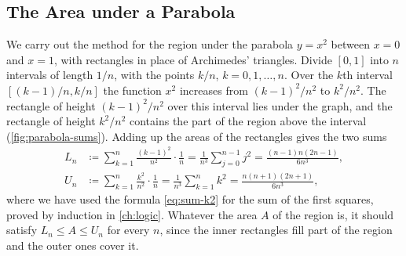\subsection{The Area under a Parabola}

We carry out the method for the region under the parabola $y=x^2$ between $x=0$ and $x=1$, with rectangles in place of Archimedes' triangles. Divide $[0,1]$ into $n$ intervals of length $1/n$, with the points $k/n$, $k=0,1,\ldots,n$. Over the $k$th interval $[(k-1)/n,k/n]$ the function $x^2$ increases from $(k-1)^2/n^2$ to $k^2/n^2$. The rectangle of height $(k-1)^2/n^2$ over this interval lies under the graph, and the rectangle of height $k^2/n^2$ contains the part of the region above the interval (\cref{fig:parabola-sums}). Adding up the areas of the rectangles gives the two sums
\begin{align*}
L_n&\coloneqq\sum_{k=1}^n\frac{(k-1)^2}{n^2}\cdot\frac1n=\frac1{n^3}\sum_{j=0}^{n-1}j^2=\frac{(n-1)n(2n-1)}{6n^3},\\
U_n&\coloneqq\sum_{k=1}^n\frac{k^2}{n^2}\cdot\frac1n=\frac1{n^3}\sum_{k=1}^{n}k^2=\frac{n(n+1)(2n+1)}{6n^3},
\end{align*}
where we have used the formula \eqref{eq:sum-k2} for the sum of the first squares, proved by induction in \cref{ch:logic}. Whatever the area $A$ of the region is, it should satisfy $L_n\le A\le U_n$ for every $n$, since the inner rectangles fill part of the region and the outer ones cover it.

